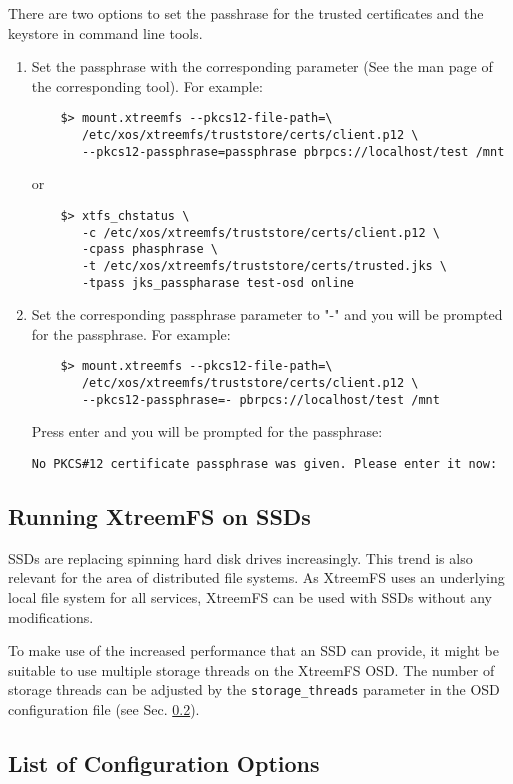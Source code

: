 \documentclass[a4paper,10pt]{book}
\begin{document}
There are two options to set the passhrase for the trusted certificates and the keystore in command line tools.
\begin{enumerate}
\item Set the passphrase with the corresponding parameter (See the man page of the corresponding tool). For example:
\begin{verbatim}
	$> mount.xtreemfs --pkcs12-file-path=\
	   /etc/xos/xtreemfs/truststore/certs/client.p12 \
	   --pkcs12-passphrase=passphrase pbrpcs://localhost/test /mnt
\end{verbatim}
or
\begin{verbatim}
	$> xtfs_chstatus \
	   -c /etc/xos/xtreemfs/truststore/certs/client.p12 \
	   -cpass phasphrase \
	   -t /etc/xos/xtreemfs/truststore/certs/trusted.jks \
	   -tpass jks_passpharase test-osd online
\end{verbatim}
\item Set the corresponding passphrase parameter to "-" and you will be prompted for the passphrase. For example:
\begin{verbatim}
	$> mount.xtreemfs --pkcs12-file-path=\
	   /etc/xos/xtreemfs/truststore/certs/client.p12 \
	   --pkcs12-passphrase=- pbrpcs://localhost/test /mnt
\end{verbatim}
Press enter and you will be prompted for the passphrase:
\begin{verbatim}
No PKCS#12 certificate passphrase was given. Please enter it now:
\end{verbatim}
\end{enumerate}

\subsection{Running XtreemFS on SSDs}
\label{sec:ssds}

SSDs are replacing spinning hard disk drives increasingly. This trend is also relevant for the area of distributed file systems. As XtreemFS uses an underlying local file system for all services, XtreemFS can be used with SSDs without any modifications.

To make use of the increased performance that an SSD can provide, it might be suitable to use multiple storage threads on the XtreemFS OSD. The number of storage threads can be adjusted by the \texttt{storage\_threads} parameter in the OSD configuration file (see Sec. \ref{sec:config}).


\subsection{List of Configuration Options}
\label{sec:config}
\end{document}
